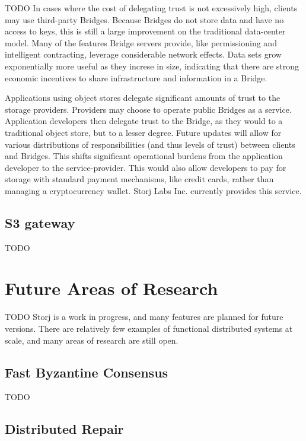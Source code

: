 \documentclass[a4paper,10pt]{article}
\newcommand{\todo}[1]{{\color{red} TODO #1}}
\begin{document}
\todo{
In cases where the cost of delegating trust is not excessively high, clients may
use third-party Bridges. Because Bridges do not store data and have no access to
keys, this is still a large improvement on the traditional data-center model.
Many of the features Bridge servers provide, like permissioning and intelligent
contracting, leverage considerable network effects. Data sets grow exponentially
more useful as they increse in size, indicating that there are strong economic
incentives to share infrastructure and information in a Bridge.

Applications using object stores delegate significant amounts of trust to the
storage providers. Providers may choose to operate public Bridges as a service.
Application developers then delegate trust to the Bridge, as they would to a
traditional object store, but to a lesser degree. Future updates will allow for
various distributions of responsibilities (and thus levels of trust) between
clients and Bridges. This shifts significant operational burdens from the
application developer to the service-provider. This would also allow developers
to pay for storage with standard payment mechanisms, like credit cards, rather
than managing a cryptocurrency wallet. Storj Labs Inc. currently provides this
service.
}

\subsection{S3 gateway}

\todo{}

\section{Future Areas of Research}\label{sec:future_work}

\todo{
Storj is a work in progress, and many features are planned for future versions.
There are relatively few examples of functional distributed systems at scale,
and many areas of research are still open.
}

\subsection{Fast Byzantine Consensus}

\todo{}

\subsection{Distributed Repair}
\end{document}
